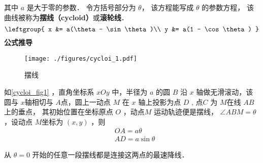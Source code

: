 
\begin{issues}
\issueDraft
\end{issues}

其中 $a$ 是大于零的参数． 令方括号部分为 $\theta$， 该方程能写成 $\theta$ 的参数方程， 该曲线被称为\textbf{摆线（cycloid）}或\textbf{滚轮线}． %
\begin{equation}
\leftgroup{
x &= a(\theta - \sin\theta)\\
y &= a(1 - \cos\theta)
}\end{equation}
\textbf{公式推导}
\begin{figure}[ht]
\centering
\texttt{[image: ./figures/cycloi\_1.pdf]}
\caption{摆线} \label{cycloi_fig1}
\end{figure}
如\autoref{cycloi_fig1} ，直角坐标系 $xOy$ 中，半径为 $a$ 的圆 $B$ 沿 $x$ 轴做无滑滚动，该圆与 $x$轴相切与 $A$点，圆上一动点 $M$ 在 $x$ 轴上投影为点 $D$ , 点$C$ 为 $M$在线 $AB$上的垂点， 其初始位置在坐标原点 $O$ ，动点$M$ 运动轨迹便是摆线， $\angle ABM=\theta$ ，设动点 $M$坐标为 $(x,y)$ ，则
\begin{equation}
\begin{aligned}
&OA=a\theta \\
&AD=a\sin\theta
\end{aligned}
\end{equation}



从 $\theta = 0$ 开始的任意一段摆线都是连接这两点的最速降线． 
